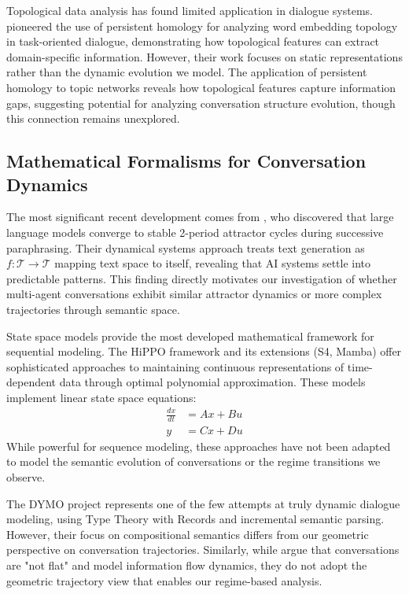 \documentclass[11pt,letterpaper]{article}
\begin{document}
Topological data analysis has found limited application in dialogue systems. \citep{vukovic2022dialogue} pioneered the use of persistent homology for analyzing word embedding topology in task-oriented dialogue, demonstrating how topological features can extract domain-specific information. However, their work focuses on static representations rather than the dynamic evolution we model. The application of persistent homology to topic networks \citep{hopp2024persistent} reveals how topological features capture information gaps, suggesting potential for analyzing conversation structure evolution, though this connection remains unexplored.

\subsection{Mathematical Formalisms for Conversation Dynamics}

The most significant recent development comes from \citep{wang2025attractor}, who discovered that large language models converge to stable 2-period attractor cycles during successive paraphrasing. Their dynamical systems approach treats text generation as $f: \mathcal{T} \rightarrow \mathcal{T}$ mapping text space to itself, revealing that AI systems settle into predictable patterns. This finding directly motivates our investigation of whether multi-agent conversations exhibit similar attractor dynamics or more complex trajectories through semantic space.

State space models provide the most developed mathematical framework for sequential modeling. The HiPPO framework \citep{gu2020hippo} and its extensions (S4, Mamba) offer sophisticated approaches to maintaining continuous representations of time-dependent data through optimal polynomial approximation. These models implement linear state space equations:
\begin{align}
\frac{dx}{dt} &= Ax + Bu \\
y &= Cx + Du
\end{align}
While powerful for sequence modeling, these approaches have not been adapted to model the semantic evolution of conversations or the regime transitions we observe.

The DYMO project \citep{eshghi2017dymo} represents one of the few attempts at truly dynamic dialogue modeling, using Type Theory with Records and incremental semantic parsing. However, their focus on compositional semantics differs from our geometric perspective on conversation trajectories. Similarly, while \citep{chen2021conversations} argue that conversations are "not flat" and model information flow dynamics, they do not adopt the geometric trajectory view that enables our regime-based analysis.
\end{document}
